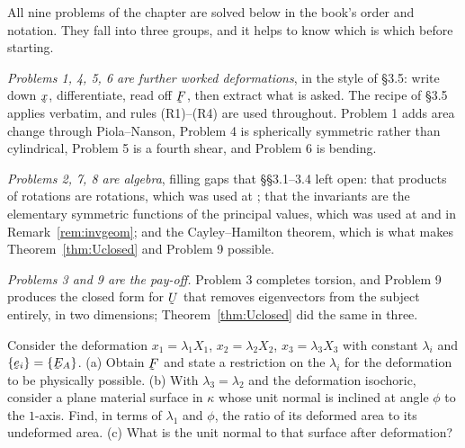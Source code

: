 All nine problems of the chapter are solved below in the book's order and
notation. They fall into three groups, and it helps to know which is which
before starting.

\emph{Problems 1, 4, 5, 6 are further worked deformations}, in the style of
\S3.5: write down $\bx$, differentiate, read off $\bF$, then extract what
is asked. The recipe of \S3.5 applies verbatim, and rules (R1)--(R4) are
used throughout. Problem 1 adds area change through Piola--Nanson,
Problem 4 is spherically symmetric rather than cylindrical, Problem 5 is a
fourth shear, and Problem 6 is bending.

\emph{Problems 2, 7, 8 are algebra}, filling gaps that \S\S3.1--3.4 left
open: that products of rotations are rotations, which was used at ;
that the invariants are the elementary symmetric functions of the
principal values, which was used at  and in
Remark~\ref{rem:invgeom}; and the Cayley--Hamilton theorem, which is what
makes Theorem~\ref{thm:Uclosed} and Problem 9 possible.

\emph{Problems 3 and 9 are the pay-off.} Problem 3 completes torsion, and
Problem 9 produces the closed form for $\bU$ that removes eigenvectors from
the subject entirely, in two dimensions; Theorem~\ref{thm:Uclosed} did the
same in three.

\begin{problem}
Consider the deformation $x_{1}=\lambda_{1}X_{1}$,
$x_{2}=\lambda_{2}X_{2}$, $x_{3}=\lambda_{3}X_{3}$ with constant
$\lambda_{i}$ and $\{\be_{i}\}=\{\bE_{A}\}$.
(a) Obtain $\bF$ and state a restriction on the $\lambda_{i}$ for the
deformation to be physically possible.
(b) With $\lambda_{3}=\lambda_{2}$ and the deformation isochoric, consider
a plane material surface in $\kappa$ whose unit normal is inclined at
angle $\phi$ to the $1$-axis. Find, in terms of $\lambda_{1}$ and $\phi$,
the ratio of its deformed area to its undeformed area.
(c) What is the unit normal to that surface after deformation?
\end{problem}

